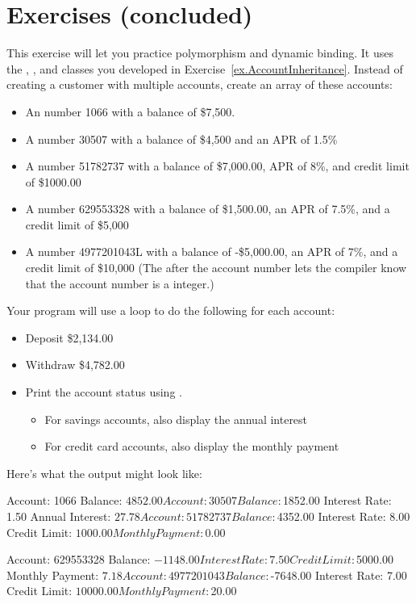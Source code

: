 \section{Exercises (concluded)}

\begin{exercise}
This exercise will let you practice polymorphism and dynamic binding. It uses the , , and  classes you developed in Exercise~\ref{ex.AccountInheritance}. Instead of creating a customer with multiple accounts, create an array of these accounts:

\begin{itemize}

\item An  number 1066 with a balance of \$7,500.
\item A  number 30507 with a balance of \$4,500 and an APR of 1.5\%
\item A  number 51782737 with a balance of \$7,000.00, APR of 8\%, and credit limit of \$1000.00
\item A  number 629553328 with a balance of \$1,500.00, an APR of 7.5\%, and a credit limit of \$5,000
\item A  number 4977201043L with a balance of -\$5,000.00, an APR of 7\%, and a credit limit of \$10,000 (The  after the account number lets the compiler know that the account number is a  integer.)
\end{itemize}

Your program will use a loop to do the following for each account:

\begin{itemize}
\item Deposit \$2,134.00
\item Withdraw \$4,782.00
\item Print the account status using .
    \begin{itemize}
        \item For savings accounts, also display the annual interest
        \item For credit card accounts, also display the monthly payment
    \end{itemize}
\end{itemize}

Here's what the output might look like:

\begin{stdout}
Account: 1066
Balance: $4852.00

Account: 30507
Balance: $1852.00
Interest Rate: 1.50%
Annual Interest: $27.78

Account: 51782737
Balance: $4352.00
Interest Rate: 8.00%
Credit Limit: $1000.00
Monthly Payment: $0.00

Account: 629553328
Balance: $-1148.00
Interest Rate: 7.50%
Credit Limit: $5000.00
Monthly Payment: $7.18

Account: 4977201043
Balance: $-7648.00
Interest Rate: 7.00%
Credit Limit: $10000.00
Monthly Payment: $20.00
\end{stdout}

\end{exercise}
